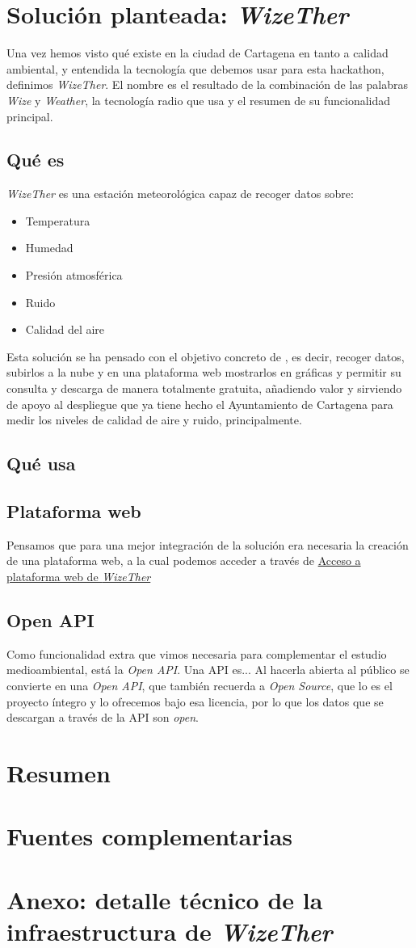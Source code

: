 \documentclass[12pt]{article}
\begin{document}
\section{Solución planteada: \textit{WizeTher}}

Una vez hemos visto qué existe en la ciudad de Cartagena en tanto a calidad ambiental, y entendida la tecnología que debemos usar para esta hackathon, definimos \textit{WizeTher}. El nombre es el resultado de la combinación de las palabras \textit{Wize} y \textit{Weather}, la tecnología radio que usa y el resumen de su funcionalidad principal. 

\subsection{Qué es} %

\textit{WizeTher} es una estación meteorológica capaz de recoger datos sobre:

\begin{itemize}
	\item Temperatura
	\item Humedad
	\item Presión atmosférica
	\item Ruido
	\item Calidad del aire
\end{itemize}

Esta solución se ha pensado con el objetivo concreto de , es decir, recoger  datos, subirlos a la nube y en una plataforma web mostrarlos en gráficas y permitir su consulta y descarga de manera totalmente gratuita, añadiendo valor y sirviendo de apoyo al despliegue que ya tiene hecho el Ayuntamiento de Cartagena para medir los niveles de calidad de aire y ruido, principalmente. 
\subsection{Qué usa}
\subsection{Plataforma web}
Pensamos que para una mejor integración de la solución era necesaria la creación de una plataforma web, a la cual podemos acceder a través de \href{https://wizether.ranii.pro/}{Acceso a plataforma web de \textit{WizeTher}}
\subsection{Open API}
Como funcionalidad extra que vimos necesaria para complementar el estudio medioambiental, está la \textit{Open API}. Una API es... Al hacerla abierta al público se convierte en una \textit{Open API}, que también recuerda a \textit{Open Source}, que lo es el proyecto íntegro y lo ofrecemos bajo esa licencia, por lo que los datos que se descargan a través de la API son \textit{open}.
\section{Resumen}

\section{Fuentes complementarias}

\section{Anexo: detalle técnico de la infraestructura de \textit{WizeTher}}
\end{document}
